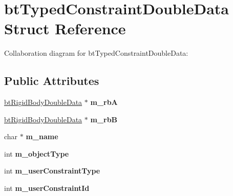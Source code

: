 \hypertarget{structbt_typed_constraint_double_data}{\section{bt\+Typed\+Constraint\+Double\+Data Struct Reference}
\label{structbt_typed_constraint_double_data}
}


Collaboration diagram for bt\+Typed\+Constraint\+Double\+Data\+:
\subsection*{Public Attributes}
\begin{DoxyCompactItemize}
\item 
\hypertarget{structbt_typed_constraint_double_data_afa9bc04c397a9d6ca9c9eb53b6268ff1}{\hyperlink{structbt_rigid_body_double_data}{bt\+Rigid\+Body\+Double\+Data} $\ast$ {\bfseries m\+\_\+rb\+A}}\label{structbt_typed_constraint_double_data_afa9bc04c397a9d6ca9c9eb53b6268ff1}

\item 
\hypertarget{structbt_typed_constraint_double_data_a6ac1414d951eaf55dda2e40f741046bd}{\hyperlink{structbt_rigid_body_double_data}{bt\+Rigid\+Body\+Double\+Data} $\ast$ {\bfseries m\+\_\+rb\+B}}\label{structbt_typed_constraint_double_data_a6ac1414d951eaf55dda2e40f741046bd}

\item 
\hypertarget{structbt_typed_constraint_double_data_a047d0b1b8429c4d3c0612b22580dd4ee}{char $\ast$ {\bfseries m\+\_\+name}}\label{structbt_typed_constraint_double_data_a047d0b1b8429c4d3c0612b22580dd4ee}

\item 
\hypertarget{structbt_typed_constraint_double_data_a4274e9a5c32972fd99baa3b540c26677}{int {\bfseries m\+\_\+object\+Type}}\label{structbt_typed_constraint_double_data_a4274e9a5c32972fd99baa3b540c26677}

\item 
\hypertarget{structbt_typed_constraint_double_data_a21e0d6577fe4650e72d07b7fc138480a}{int {\bfseries m\+\_\+user\+Constraint\+Type}}\label{structbt_typed_constraint_double_data_a21e0d6577fe4650e72d07b7fc138480a}

\item 
\hypertarget{structbt_typed_constraint_double_data_a44950a013bc561e22e8fc175f80b1898}{int {\bfseries m\+\_\+user\+Constraint\+Id}}\label{structbt_typed_constraint_double_data_a44950a013bc561e22e8fc175f80b1898}


\end{DoxyCompactItemize}
